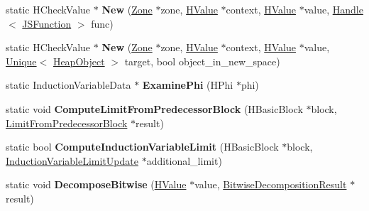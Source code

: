 \begin{DoxyCompactItemize}
\item 
\hypertarget{classv8_1_1internal_1_1_v8___f_i_n_a_l_a458537a79fe5907e2740bda11ddf1ea2}{}static H\+Check\+Value $\ast$ {\bfseries New} (\hyperlink{classv8_1_1internal_1_1_zone}{Zone} $\ast$zone, \hyperlink{classv8_1_1internal_1_1_h_value}{H\+Value} $\ast$context, \hyperlink{classv8_1_1internal_1_1_h_value}{H\+Value} $\ast$value, \hyperlink{classv8_1_1internal_1_1_handle}{Handle}$<$ \hyperlink{classv8_1_1internal_1_1_j_s_function}{J\+S\+Function} $>$ func)\label{classv8_1_1internal_1_1_v8___f_i_n_a_l_a458537a79fe5907e2740bda11ddf1ea2}

\item 
\hypertarget{classv8_1_1internal_1_1_v8___f_i_n_a_l_a0f804033f3500a578f0fb7d879a23236}{}static H\+Check\+Value $\ast$ {\bfseries New} (\hyperlink{classv8_1_1internal_1_1_zone}{Zone} $\ast$zone, \hyperlink{classv8_1_1internal_1_1_h_value}{H\+Value} $\ast$context, \hyperlink{classv8_1_1internal_1_1_h_value}{H\+Value} $\ast$value, \hyperlink{classv8_1_1internal_1_1_unique}{Unique}$<$ \hyperlink{classv8_1_1internal_1_1_heap_object}{Heap\+Object} $>$ target, bool object\+\_\+in\+\_\+new\+\_\+space)\label{classv8_1_1internal_1_1_v8___f_i_n_a_l_a0f804033f3500a578f0fb7d879a23236}

\item 
\hypertarget{classv8_1_1internal_1_1_v8___f_i_n_a_l_ac7e386e9686ff2bd8cae8378bdc6b283}{}static Induction\+Variable\+Data $\ast$ {\bfseries Examine\+Phi} (H\+Phi $\ast$phi)\label{classv8_1_1internal_1_1_v8___f_i_n_a_l_ac7e386e9686ff2bd8cae8378bdc6b283}

\item 
\hypertarget{classv8_1_1internal_1_1_v8___f_i_n_a_l_aac0466a5eed60d47eced37ba372e5ea7}{}static void {\bfseries Compute\+Limit\+From\+Predecessor\+Block} (H\+Basic\+Block $\ast$block, \hyperlink{structv8_1_1internal_1_1_v8___f_i_n_a_l_1_1_limit_from_predecessor_block}{Limit\+From\+Predecessor\+Block} $\ast$result)\label{classv8_1_1internal_1_1_v8___f_i_n_a_l_aac0466a5eed60d47eced37ba372e5ea7}

\item 
\hypertarget{classv8_1_1internal_1_1_v8___f_i_n_a_l_af21a74de6ff7067ceb0011a613555bcc}{}static bool {\bfseries Compute\+Induction\+Variable\+Limit} (H\+Basic\+Block $\ast$block, \hyperlink{structv8_1_1internal_1_1_induction_variable_limit_update}{Induction\+Variable\+Limit\+Update} $\ast$additional\+\_\+limit)\label{classv8_1_1internal_1_1_v8___f_i_n_a_l_af21a74de6ff7067ceb0011a613555bcc}

\item 
\hypertarget{classv8_1_1internal_1_1_v8___f_i_n_a_l_affca276154ab801ada176a4080f897ad}{}static void {\bfseries Decompose\+Bitwise} (\hyperlink{classv8_1_1internal_1_1_h_value}{H\+Value} $\ast$value, \hyperlink{structv8_1_1internal_1_1_v8___f_i_n_a_l_1_1_bitwise_decomposition_result}{Bitwise\+Decomposition\+Result} $\ast$result)\label{classv8_1_1internal_1_1_v8___f_i_n_a_l_affca276154ab801ada176a4080f897ad}


\end{DoxyCompactItemize}
